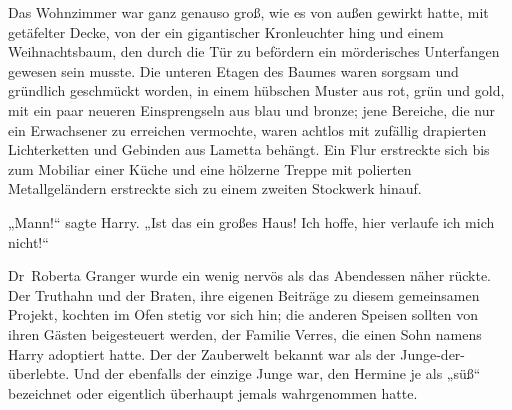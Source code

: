Das Wohnzimmer war ganz genauso groß, wie es von außen gewirkt hatte, mit getäfelter Decke, von der ein gigantischer Kronleuchter hing und einem Weihnachtsbaum, den durch die Tür zu befördern ein mörderisches Unterfangen gewesen sein musste. Die unteren Etagen des Baumes waren sorgsam und gründlich geschmückt worden, in einem hübschen Muster aus rot, grün und gold, mit ein paar neueren Einsprengseln aus blau und bronze; jene Bereiche, die nur ein Erwachsener zu erreichen vermochte, waren achtlos mit zufällig drapierten Lichterketten und Gebinden aus Lametta behängt. Ein Flur erstreckte sich bis zum Mobiliar einer Küche und eine hölzerne Treppe mit polierten Metallgeländern erstreckte sich zu einem zweiten Stockwerk hinauf.

„Mann!“ sagte Harry. „Ist das ein großes Haus! Ich hoffe, hier verlaufe ich mich nicht!“

\later

Dr~Roberta Granger wurde ein wenig nervös als das Abendessen näher rückte. Der Truthahn und der Braten, ihre eigenen Beiträge zu diesem gemeinsamen Projekt, kochten im Ofen stetig vor sich hin; die anderen Speisen sollten von ihren Gästen beigesteuert werden, der Familie Verres, die einen Sohn namens Harry adoptiert hatte. Der der Zauberwelt bekannt war als der Junge-der-überlebte. Und der ebenfalls der einzige Junge war, den Hermine je als „süß“ bezeichnet oder eigentlich überhaupt jemals wahrgenommen hatte.

